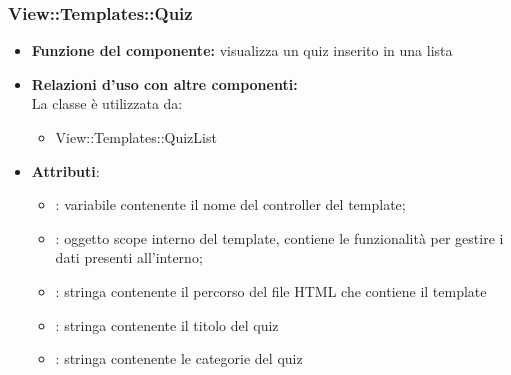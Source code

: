 \subsubsection{View::Templates::Quiz}
\begin{itemize}
\item\textbf{Funzione del componente:} visualizza un quiz inserito in una lista
				\item\textbf{Relazioni d'uso con altre componenti:}\\
 La classe è utilizzata da:
 	\begin{itemize}
 		\item View::Templates::QuizList
 	\end{itemize}
 \item\textbf{Attributi}:
 	\begin{itemize}
 		\item{}: variabile contenente il nome del controller del template;\\
		\item{}: oggetto scope interno del template, contiene le funzionalità per gestire i dati presenti all’interno;\\
		\item{}: stringa contenente il percorso del file HTML che contiene il template\\
		\item{}: stringa contenente il titolo del quiz
		\item{}: stringa contenente le categorie del quiz
 	\end{itemize}
 \end{itemize}
 
